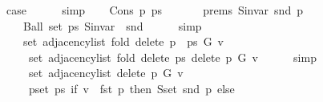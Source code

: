 \begin{isabellebody}
\ {\isacharquery}{\kern0pt}case\isanewline
\ \ \ \ \isamarkupfalse%
\ simp\isanewline
{}\isamarkupfalse%
\isanewline
\ \ \isamarkupfalse%
\ {\isacharparenleft}{\kern0pt}Cons\ p\ ps{\isacharparenright}{\kern0pt}\isanewline
\ \ \isamarkupfalse%
\isanewline
\ \ \ \ prems{\isacharcolon}{\kern0pt}\ {\isachardoublequoteopen}S{\isachardot}{\kern0pt}invar\ {\isacharparenleft}{\kern0pt}snd\ p{\isacharparenright}{\kern0pt}{\isachardoublequoteclose}\isanewline
\ \ \ \ {\isachardoublequoteopen}Ball\ {\isacharparenleft}{\kern0pt}set\ ps{\isacharparenright}{\kern0pt}\ {\isacharparenleft}{\kern0pt}S{\isachardot}{\kern0pt}invar\ {\isasymcirc}\ snd{\isacharparenright}{\kern0pt}{\isachardoublequoteclose}\isanewline
\ \ \ \ \isamarkupfalse%
\ simp{\isacharplus}{\kern0pt}\isanewline
\isanewline
\ \ \isamarkupfalse%
\isanewline
\ \ \ \ {\isachardoublequoteopen}set\ {\isacharparenleft}{\kern0pt}adjacency{\isacharunderscore}{\kern0pt}list\ {\isacharparenleft}{\kern0pt}fold\ delete{\isacharunderscore}{\kern0pt}{}\ {\isacharparenleft}{\kern0pt}p\ {\isacharhash}{\kern0pt}\ ps{\isacharparenright}{\kern0pt}\ G{\isacharparenright}{\kern0pt}\ v{\isacharparenright}{\kern0pt}\ {\isacharequal}{\kern0pt}\isanewline
\ \ \ \ \ set\ {\isacharparenleft}{\kern0pt}adjacency{\isacharunderscore}{\kern0pt}list\ {\isacharparenleft}{\kern0pt}fold\ delete{\isacharunderscore}{\kern0pt}{}\ ps\ {\isacharparenleft}{\kern0pt}delete{\isacharunderscore}{\kern0pt}{}\ p\ G{\isacharparenright}{\kern0pt}{\isacharparenright}{\kern0pt}\ v{\isacharparenright}{\kern0pt}{\isachardoublequoteclose}\isanewline
\ \ \ \ \isamarkupfalse%
\ simp\isanewline
\ \ \isamarkupfalse%
\ \isamarkupfalse%
\isanewline
\ \ \ \ {\isachardoublequoteopen}{\isachardot}{\kern0pt}{\isachardot}{\kern0pt}{\isachardot}{\kern0pt}\ {\isacharequal}{\kern0pt}\isanewline
\ \ \ \ \ set\ {\isacharparenleft}{\kern0pt}adjacency{\isacharunderscore}{\kern0pt}list\ {\isacharparenleft}{\kern0pt}delete{\isacharunderscore}{\kern0pt}{}\ p\ G{\isacharparenright}{\kern0pt}\ v{\isacharparenright}{\kern0pt}\ {\isacharminus}{\kern0pt}\isanewline
\ \ \ \ \ {\isacharparenleft}{\kern0pt}{\isasymUnion}p{\isasymin}set\ ps{\isachardot}{\kern0pt}\ if\ v\ {\isacharequal}{\kern0pt}\ fst\ p\ then\ S{\isachardot}{\kern0pt}set\ {\isacharparenleft}{\kern0pt}snd\ p{\isacharparenright}{\kern0pt}\ else\ {\isacharbraceleft}{\kern0pt}{\isacharbraceright}{\kern0pt}{\isacharparenright}{\kern0pt}{\isachardoublequoteclose}\isanewline

\end{isabellebody}
